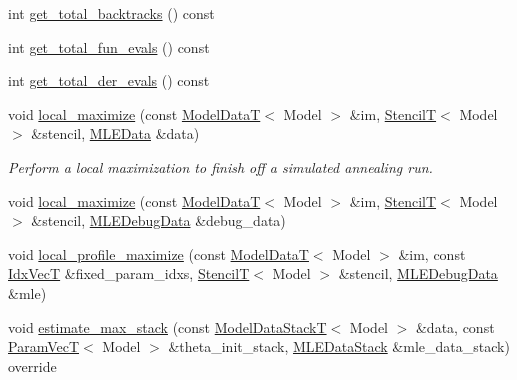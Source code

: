 \begin{DoxyCompactItemize}
int \hyperlink{classmappel_1_1estimator_1_1IterativeMaximizer_a5b689ae57a9f2bf64739fab6d32ca74b}{get\+\_\+total\+\_\+backtracks} () const 
\item 
int \hyperlink{classmappel_1_1estimator_1_1IterativeMaximizer_a4ab922cd52088ae3e940e4f0d6fac066}{get\+\_\+total\+\_\+fun\+\_\+evals} () const 
\item 
int \hyperlink{classmappel_1_1estimator_1_1IterativeMaximizer_aa522c84aaaa2b745b3112e9fd2cf4fc9}{get\+\_\+total\+\_\+der\+\_\+evals} () const 
\item 
void \hyperlink{classmappel_1_1estimator_1_1IterativeMaximizer_a35bda016bda047cdd6816ed1a8f76d30}{local\+\_\+maximize} (const \hyperlink{namespacemappel_a97f050df953605381ae9c901c3b125f1}{Model\+DataT}$<$ Model $>$ \&im, \hyperlink{namespacemappel_a3a06598240007876f8c4bf834ad86197}{StencilT}$<$ Model $>$ \&stencil, \hyperlink{namespacemappel_1_1estimator_structmappel_1_1estimator_1_1MLEData}{M\+L\+E\+Data} \&data)
\begin{DoxyCompactList}\small\item\em Perform a local maximization to finish off a simulated annealing run. \end{DoxyCompactList}\item 
void \hyperlink{classmappel_1_1estimator_1_1IterativeMaximizer_a2fd6152953dcc530a23350dcc93baf7c}{local\+\_\+maximize} (const \hyperlink{namespacemappel_a97f050df953605381ae9c901c3b125f1}{Model\+DataT}$<$ Model $>$ \&im, \hyperlink{namespacemappel_a3a06598240007876f8c4bf834ad86197}{StencilT}$<$ Model $>$ \&stencil, \hyperlink{structmappel_1_1estimator_1_1MLEDebugData}{M\+L\+E\+Debug\+Data} \&debug\+\_\+data)
\item 
void \hyperlink{classmappel_1_1estimator_1_1IterativeMaximizer_acc71726ed0876fd59ce3b07ea9950625}{local\+\_\+profile\+\_\+maximize} (const \hyperlink{namespacemappel_a97f050df953605381ae9c901c3b125f1}{Model\+DataT}$<$ Model $>$ \&im, const \hyperlink{namespacemappel_ac63743dcd42180127307cd0e4ecdd784}{Idx\+VecT} \&fixed\+\_\+param\+\_\+idxs, \hyperlink{namespacemappel_a3a06598240007876f8c4bf834ad86197}{StencilT}$<$ Model $>$ \&stencil, \hyperlink{structmappel_1_1estimator_1_1MLEDebugData}{M\+L\+E\+Debug\+Data} \&mle)
\item 
void \hyperlink{classmappel_1_1estimator_1_1ThreadedEstimator_a797b6479fbab450a42099cfdb07e900f}{estimate\+\_\+max\+\_\+stack} (const \hyperlink{namespacemappel_aaeb6665bc57476dd93c2df6ad8bc4768}{Model\+Data\+StackT}$<$ Model $>$ \&data, const \hyperlink{namespacemappel_a0f86d3153e4e27b095012f140eea58de}{Param\+VecT}$<$ Model $>$ \&theta\+\_\+init\+\_\+stack, \hyperlink{namespacemappel_1_1estimator_structmappel_1_1estimator_1_1MLEDataStack}{M\+L\+E\+Data\+Stack} \&mle\+\_\+data\+\_\+stack) override

\end{DoxyCompactItemize}
